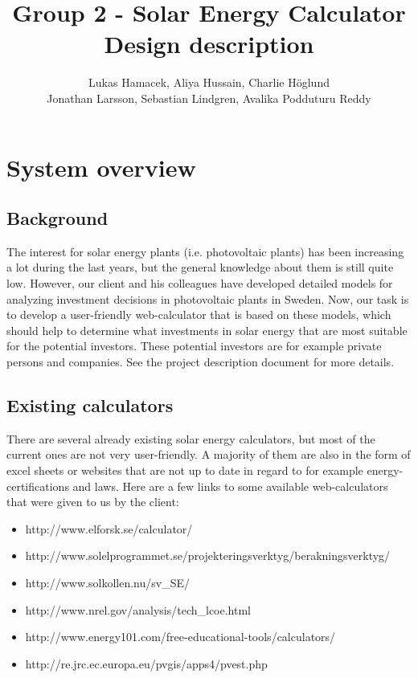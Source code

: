 \documentclass[]{article}
\title{Group 2 - Solar Energy Calculator\\Design description}
\author{  Lukas Hamacek, Aliya Hussain, Charlie H{\"o}glund 
		\\Jonathan Larsson, Sebastian Lindgren, Avalika Podduturu Reddy}
\begin{document}
\maketitle
\pagebreak
\tableofcontents
\listoffigures
\pagebreak

\section{System overview}
\subsection{Background}
The interest for solar energy plants (i.e. photovoltaic plants) has been increasing
a lot during the last years, but the general knowledge about them is still quite
low. However, our client and his colleagues have developed detailed models for
analyzing investment decisions in photovoltaic plants in Sweden. Now, our task
is to develop a user-friendly web-calculator that is based on these models, which
should help to determine what investments in solar energy that are most suitable
for the potential investors. These potential investors are for example private persons and companies. See the project description document for more details.

\subsection{Existing calculators}
There are several already existing solar energy calculators, but most of the current ones are not very user-friendly. A majority of them are also in the form of excel sheets or websites that are not up to date in regard to for example energy-certifications and laws. Here are a few links to some available web-calculators that were given to us by the client:

\begin{itemize}
	\item http://www.elforsk.se/calculator/
	\item http://www.solelprogrammet.se/projekteringsverktyg/berakningsverktyg/
	\item http://www.solkollen.nu/sv\_SE/
	\item http://www.nrel.gov/analysis/tech\_lcoe.html
	\item http://www.energy101.com/free-educational-tools/calculators/
	\item http://re.jrc.ec.europa.eu/pvgis/apps4/pvest.php
\end{itemize}
\end{document}
